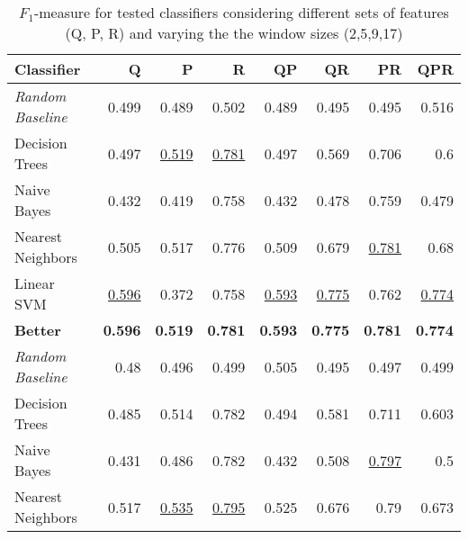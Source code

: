 \documentclass[runningheads]{llncs}
\begin{document}
\begin{table*}[t]
	\caption{$F_1$-measure for tested classifiers considering different sets of features (Q, P, R) and varying the the window sizes (2,5,9,17)}
	\label{tab:classifier}
	\begin{tabular}{lrrrrrrr}    \toprule
		\textbf{Classifier}        & \textsc{Q}         & \textsc{P}         & \textsc{R}         & \textsc{QP}        & \textsc{QR}        & \textsc{PR}        & \textsc{QPR}       \\    \midrule
		\textit{Random Baseline} & 0.499          & 0.489          & 0.502          & 0.489          & 0.495          & 0.495          & 0.516          \\
		Decision Trees           & 0.497          & \underline{0.519}    & \underline{0.781}    & 0.497          & 0.569          & 0.706          & 0.6            \\
		Naive Bayes              & 0.432          & 0.419          & 0.758          & 0.432          & 0.478          & 0.759          & 0.479          \\
		Nearest Neighbors        & 0.505          & 0.517          & 0.776          & 0.509          & 0.679          & \underline{0.781}    & 0.68           \\
		Linear SVM               & \underline{0.596}    & 0.372          & 0.758          & \underline{0.593}    & \underline{0.775}    & 0.762          & \underline{0.774}    \\    \midrule
		\textbf{Better}          & \textbf{0.596} & \textbf{0.519} & \textbf{0.781} & \textbf{0.593} & \textbf{0.775} & \textbf{0.781} & \textbf{0.774} \\    \bottomrule
		\textit{Random Baseline} & 0.48           & 0.496          & 0.499          & 0.505          & 0.495          & 0.497          & 0.499          \\
		Decision Trees           & 0.485          & 0.514          & 0.782          & 0.494          & 0.581          & 0.711          & 0.603          \\
		Naive Bayes              & 0.431          & 0.486          & 0.782          & 0.432          & 0.508          & \underline{0.797}    & 0.5            \\
		Nearest Neighbors        & 0.517          & \underline{0.535}    & \underline{0.795}    & 0.525          & 0.676          & 0.79           & 0.673          \\

\end{tabular}
\end{table*}
\end{document}
